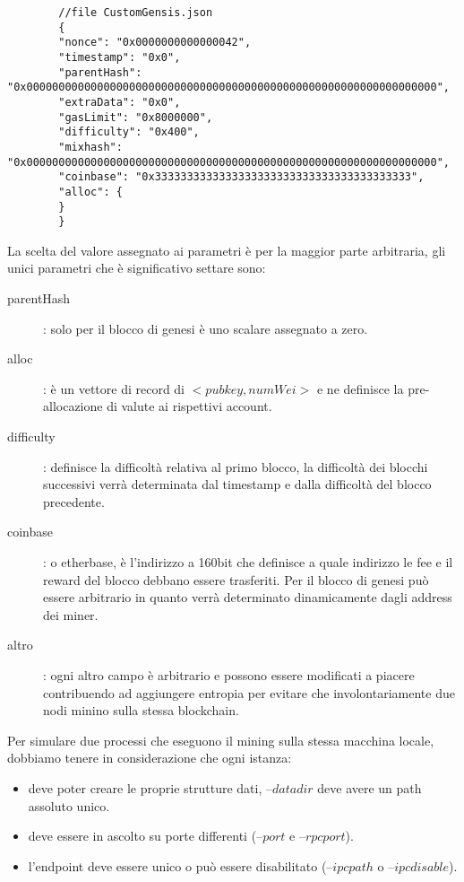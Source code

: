 \begin{appendices}
		\begin{lstlisting}
		//file CustomGensis.json
		{
		"nonce": "0x0000000000000042",
		"timestamp": "0x0",
		"parentHash": "0x0000000000000000000000000000000000000000000000000000000000000000",
		"extraData": "0x0",
		"gasLimit": "0x8000000",
		"difficulty": "0x400",
		"mixhash": "0x0000000000000000000000000000000000000000000000000000000000000000",
		"coinbase": "0x3333333333333333333333333333333333333333",
		"alloc": {
		}
		}
		\end{lstlisting}
		
		La scelta del valore assegnato ai parametri è per la maggior parte arbitraria, gli unici parametri che è significativo settare sono:
		
		\begin{description}
			\item[parentHash]: solo per il blocco di genesi è uno scalare assegnato a zero.
			\item[alloc]: è un vettore di record di $<pubkey,numWei>$ e ne definisce la pre-allocazione di valute ai rispettivi account.
			\item[difficulty]: definisce la difficoltà relativa al primo blocco, la difficoltà dei blocchi successivi verrà determinata dal timestamp e dalla difficoltà del blocco precedente.
			\item[coinbase]: o etherbase, è l'indirizzo a 160bit che definisce a quale indirizzo le fee e il reward del blocco debbano essere trasferiti. Per il blocco di genesi può essere arbitrario in quanto verrà determinato dinamicamente dagli address dei miner.
			\item[altro]: ogni altro campo è arbitrario e possono essere modificati a piacere contribuendo ad aggiungere entropia per evitare che involontariamente due nodi minino sulla stessa blockchain.
		\end{description}
		
		
		Per simulare due processi che eseguono il mining sulla stessa macchina locale, dobbiamo tenere in considerazione che ogni istanza: 
		\begin{itemize}
			\item deve poter creare le proprie strutture dati, --$datadir$ deve avere un path assoluto unico.
			\item deve essere in ascolto su porte differenti (--$port$ e --$rpcport$).
			\item l'endpoint deve essere unico o può essere disabilitato (--$ipcpath$ o --$ipcdisable$).
		\end{itemize}
		

\end{appendices}
